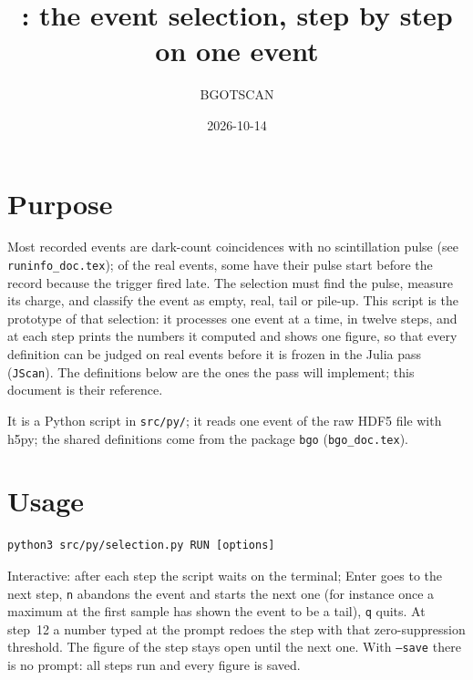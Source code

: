 \documentclass[11pt]{article}
\title{\code{selection.py}: the event selection, step by step on one event}
\author{BGOTSCAN}
\date{2026-10-14}
\newcommand{\code}[1]{\texttt{#1}}
\begin{document}
\maketitle

\section{Purpose}

Most recorded events are dark-count coincidences with no scintillation
pulse (see \code{runinfo\_doc.tex}); of the real events, some have their
pulse start before the record because the trigger fired late. The
selection must find the pulse, measure its charge, and classify the event
as empty, real, tail or pile-up. This script is the prototype of that
selection: it processes one event at a time, in twelve steps, and at each
step prints the numbers it computed and shows one figure, so that every
definition can be judged on real events before it is frozen in the Julia
pass (\code{JScan}). The definitions below are the ones the pass will
implement; this document is their reference.

It is a Python script in \code{src/py/}; it reads one event of the raw
HDF5 file with h5py; the shared definitions come from the package \code{bgo}
(\code{bgo\_doc.tex}).

\section{Usage}

\begin{lstlisting}
python3 src/py/selection.py RUN [options]
\end{lstlisting}

Interactive: after each step the script waits on the terminal; Enter goes
to the next step, \code{n} abandons the event and starts the next one (for
instance once a maximum at the first sample has shown the event to be a
tail), \code{q} quits. At step~12 a number typed at the prompt redoes the
step with that zero-suppression threshold. The figure of the step stays open until
the next one. With \code{--save} there is no prompt: all steps run and
every figure is saved.
\end{document}

